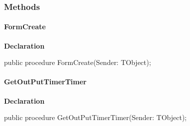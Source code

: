 \documentclass{report}
\newif\ifpdf
\begin{document}
\subsubsection*{\large{\textbf{Methods}}\normalsize\hspace{1ex}\hfill}
\paragraph*{FormCreate}\hspace*{\fill}

\label{pkgconvertdisp.TConvDisp-FormCreate}
\begin{list}{}{
\setlength{\itemindent}{0cm}
\setlength{\listparindent}{0cm}
\setlength{\leftmargin}{\evensidemargin}
\addtolength{\leftmargin}{\tmplength}
\settowidth{\labelsep}{X}
\addtolength{\leftmargin}{\labelsep}
\setlength{\labelwidth}{\tmplength}
}
\item[\textbf{Declaration}\hfill]
\ifpdf
\begin{flushleft}
\fi
\begin{ttfamily}
public procedure FormCreate(Sender: TObject);\end{ttfamily}

\ifpdf
\end{flushleft}
\fi

\end{list}
\paragraph*{GetOutPutTimerTimer}\hspace*{\fill}

\label{pkgconvertdisp.TConvDisp-GetOutPutTimerTimer}
\begin{list}{}{
\setlength{\itemindent}{0cm}
\setlength{\listparindent}{0cm}
\setlength{\leftmargin}{\evensidemargin}
\addtolength{\leftmargin}{\tmplength}
\settowidth{\labelsep}{X}
\addtolength{\leftmargin}{\labelsep}
\setlength{\labelwidth}{\tmplength}
}
\item[\textbf{Declaration}\hfill]
\ifpdf
\begin{flushleft}
\fi
\begin{ttfamily}
public procedure GetOutPutTimerTimer(Sender: TObject);\end{ttfamily}

\ifpdf
\end{flushleft}
\fi

\end{list}
\end{document}
